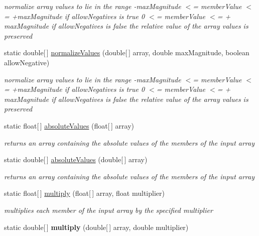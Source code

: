 \begin{DoxyCompactItemize}
\begin{DoxyCompactList}\small\item\em normalize array values to lie in the range -\/max\-Magnitude $<$= member\-Value $<$= +max\-Magnitude if allow\-Negatives is true 0 $<$= member\-Value $<$= + max\-Magnitude if allow\-Negatives is false the relative value of the array values is preserved \end{DoxyCompactList}\item 
static double\mbox{[}$\,$\mbox{]} \hyperlink{classuk_1_1ac_1_1dmu_1_1iesd_1_1cascade_1_1util_1_1_array_utils_af05acff9c2f6bb75893a2ad84ff64195}{normalize\-Values} (double\mbox{[}$\,$\mbox{]} array, double max\-Magnitude, boolean allow\-Negative)
\begin{DoxyCompactList}\small\item\em normalize array values to lie in the range -\/max\-Magnitude $<$= member\-Value $<$= +max\-Magnitude if allow\-Negatives is true 0 $<$= member\-Value $<$= + max\-Magnitude if allow\-Negatives is false the relative value of the array values is preserved \end{DoxyCompactList}\item 
static float\mbox{[}$\,$\mbox{]} \hyperlink{classuk_1_1ac_1_1dmu_1_1iesd_1_1cascade_1_1util_1_1_array_utils_a6384a1b0807d190cd04d54fb6f5b070f}{absolute\-Values} (float\mbox{[}$\,$\mbox{]} array)
\begin{DoxyCompactList}\small\item\em returns an array containing the absolute values of the members of the input array \end{DoxyCompactList}\item 
static double\mbox{[}$\,$\mbox{]} \hyperlink{classuk_1_1ac_1_1dmu_1_1iesd_1_1cascade_1_1util_1_1_array_utils_a995c00b09b08bebfe50a3d351c758d77}{absolute\-Values} (double\mbox{[}$\,$\mbox{]} array)
\begin{DoxyCompactList}\small\item\em returns an array containing the absolute values of the members of the input array \end{DoxyCompactList}\item 
static float\mbox{[}$\,$\mbox{]} \hyperlink{classuk_1_1ac_1_1dmu_1_1iesd_1_1cascade_1_1util_1_1_array_utils_a7c38e758dcf1b623264ca6a15426c45a}{multiply} (float\mbox{[}$\,$\mbox{]} array, float multiplier)
\begin{DoxyCompactList}\small\item\em multiplies each member of the input array by the specified multiplier \end{DoxyCompactList}\item 
\hypertarget{classuk_1_1ac_1_1dmu_1_1iesd_1_1cascade_1_1util_1_1_array_utils_a131ace2939ab2f627fbe63c57b8eccbd}{static double\mbox{[}$\,$\mbox{]} {\bfseries multiply} (double\mbox{[}$\,$\mbox{]} array, double multiplier)}\label{classuk_1_1ac_1_1dmu_1_1iesd_1_1cascade_1_1util_1_1_array_utils_a131ace2939ab2f627fbe63c57b8eccbd}


\end{DoxyCompactItemize}
